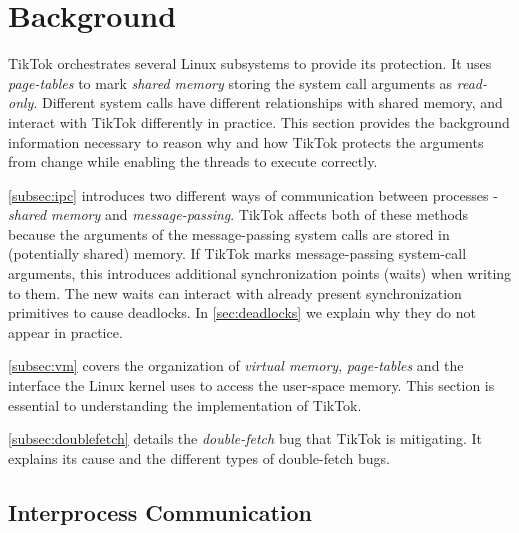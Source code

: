 \documentclass[conference]{IEEEtran}
\newcommand{\sysname}{TikTok}
\begin{document}
\section{Background}
\label{sec:background}

\sysname{} orchestrates several Linux subsystems to provide its protection. It uses
\emph{page-tables} to mark \emph{shared memory} storing the system call
arguments as \emph{read-only}. Different system calls have different
relationships with shared memory, and interact with \sysname{} differently in
practice. This section provides the background information necessary to reason
why and how \sysname{} protects the arguments from change while enabling the threads to
execute correctly.

\autoref{subsec:ipc} introduces two different ways of communication between
processes - \emph{shared memory} and \emph{message-passing}. \sysname{} affects
both of these methods because the arguments of the message-passing system calls
are stored in (potentially shared) memory. If \sysname{} marks message-passing
system-call arguments, this introduces additional synchronization points (waits)
when writing to them. The new waits can interact with already present
synchronization primitives to cause deadlocks. In \autoref{sec:deadlocks} we
explain why they do not appear in practice.

\autoref{subsec:vm} covers the organization of \emph{virtual memory},
\emph{page-tables} and the interface the Linux kernel uses to access the
user-space memory. This section is essential to understanding the implementation
of \sysname.

\autoref{subsec:doublefetch} details the \emph{double-fetch} bug that \sysname{}
is mitigating. It explains its cause and the different types of double-fetch bugs.


\subsection{Interprocess Communication}
\label{subsec:ipc}
\end{document}
